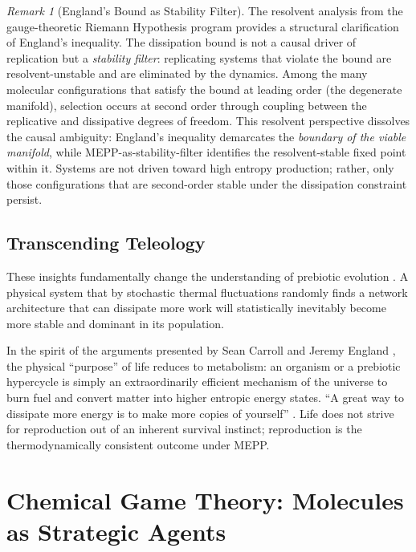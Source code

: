 \documentclass[12pt,a4paper]{article}
\theoremstyle{remark}
\newtheorem{remark}{Remark}
\begin{document}
\begin{remark}[England's Bound as Stability Filter]
\label{rem:england-stability-filter}
The resolvent analysis from the gauge-theoretic Riemann Hypothesis program \citep{GeigerRH2026b} provides a structural clarification of England's inequality. The dissipation bound is not a causal driver of replication but a \emph{stability filter}: replicating systems that violate the bound are resolvent-unstable and are eliminated by the dynamics. Among the many molecular configurations that satisfy the bound at leading order (the degenerate manifold), selection occurs at second order through coupling between the replicative and dissipative degrees of freedom. This resolvent perspective dissolves the causal ambiguity: England's inequality demarcates the \emph{boundary of the viable manifold}, while MEPP-as-stability-filter identifies the resolvent-stable fixed point within it. Systems are not driven toward high entropy production; rather, only those configurations that are second-order stable under the dissipation constraint persist.
\end{remark}

\subsection{Transcending Teleology}

These insights fundamentally change the understanding of prebiotic evolution \citep{UnbecomingBeing}. A physical system that by stochastic thermal fluctuations randomly finds a network architecture that can dissipate more work will statistically inevitably become more stable and dominant in its population.

In the spirit of the arguments presented by Sean Carroll \citep{UnbecomingBeing} and Jeremy England \citep{England2013}, the physical ``purpose'' of life reduces to metabolism: an organism or a prebiotic hypercycle is simply an extraordinarily efficient mechanism of the universe to burn fuel and convert matter into higher entropic energy states. ``A great way to dissipate more energy is to make more copies of yourself'' \citep{England2013}. Life does not strive for reproduction out of an inherent survival instinct; reproduction is the thermodynamically consistent outcome under MEPP.

\section{Chemical Game Theory: Molecules as Strategic Agents}
\label{sec:cgt}
\end{document}
